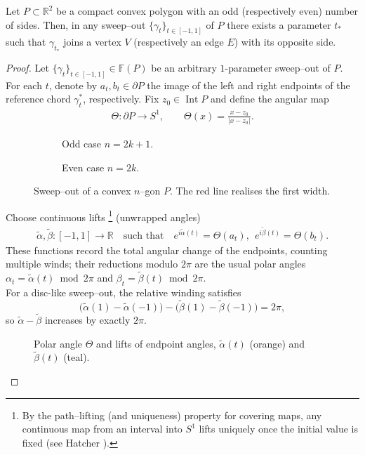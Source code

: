 \begin{lemma}\label{lem:polygon-width-ub}
Let $P \subset \mathbb{R}^2$ be a compact convex polygon with an odd (respectively even) number of sides. Then, in any sweep--out $\{\gamma_t\}_{t \in [-1,1]}$ of $P$ there exists a parameter $t_*$ such that $\gamma_{t_*}$ joins a vertex $V$ (respectively an edge $E$) with its opposite side.
\end{lemma}
\begin{proof}
Let $\{\gamma_t\}_{t\in[-1,1]} \in \mathbb{F}(P)$ be an arbitrary $1$-parameter sweep--out of $P$. For each $t$, denote by $a_t,b_t\in\partial P$ the image of the left and right endpoints of the reference chord $\gamma_t^*$, respectively. Fix $z_0\in\operatorname{Int} P$ and define the angular map
\begin{align*}
\Theta:\partial P\to S^1,\qquad \Theta(x)=\frac{x-z_0}{|x-z_0|}.
\end{align*}
\par\vspace{1em}
\begin{figure}[ht]
  \centering
  \begin{subfigure}{0.48\linewidth}
    \centering
    
    \captionsetup{skip=8pt}
    \caption{Odd case $n=2k+1$.}
    \label{fig:odd}
  \end{subfigure}\hfill
  \begin{subfigure}{0.48\linewidth}
    \centering
    
    \captionsetup{skip=16pt}
    \caption{Even case $n=2k$.}
    \label{fig:even}
  \end{subfigure}
  \caption{Sweep--out of a convex $n$–gon $P$. The red line realises the first width.}
  \label{fig:opp-edges}
\end{figure}
\vspace{1em}

\noindent Choose continuous lifts \footnote{By the path–lifting (and uniqueness) property for covering maps, any continuous map from an interval into $S^1$ lifts uniquely once the initial value is fixed (see Hatcher \cite{Hatcher02}).} (unwrapped angles)
\begin{align*}
\tilde \alpha,\tilde\beta:[-1,1]\to\mathbb{R} \quad\text{such that}\quad e^{i\tilde\alpha(t)}=\Theta(a_t),\ \ e^{i\tilde\beta(t)}=\Theta(b_t).
\end{align*}
These functions record the total angular change of the endpoints, counting multiple winds; their reductions modulo $2\pi$ are the usual polar angles $\alpha_t=\tilde\alpha(t) \bmod{2\pi}$ and $\beta_t=\tilde\beta(t) \bmod{2\pi}$. \\
For a disc-like sweep--out, the relative winding satisfies
\[
\big(\tilde\alpha(1)-\tilde\alpha(-1)\big) - \big(\tilde\beta(1)-\tilde\beta(-1)\big) = 2\pi,
\]
so $\tilde\alpha-\tilde\beta$ increases by exactly $2\pi$.
\begin{figure}[ht]
    \centering
    
    \caption{Polar angle $\Theta$ and lifts of endpoint angles, $\tilde{\alpha}(t)$ (orange) and $\tilde{\beta}(t)$ (teal).}
\end{figure}
\FloatBarrier


\end{proof}

